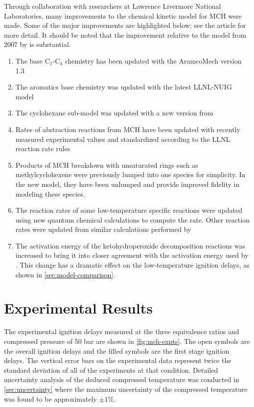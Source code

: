 \documentclass[12pt, letterpaper]{article}
\begin{document}
Through collaboration with researchers at Lawrence Livermore National 
Laboratories, many improvements to the chemical kinetic model for MCH were 
made. Some of the major improvements are highlighted below; see the article 
for more detail. It should be noted that the improvement relative to the model 
from 2007 by \textcite{Pitz2007} is substantial.

\begin{enumerate}
    \item The base C$_1$-C$_4$ chemistry has been updated with the AramcoMech 
        version 1.3 \cite{Metcalfe2013}
    \item The aromatics base chemistry was updated with the latest LLNL-NUIG
        model \cite{Nakamura2014}
    \item The cyclohexane sub-model was updated with a new version from 
        \textcite{Silke2007}
    \item Rates of abstraction reactions from MCH have been updated 
        with recently measured experimental values \cite{Sivaramakrishnan2009} 
        and standardized according to the LLNL reaction rate rules \cite{Sarathy2011b}
    \item Products of MCH breakdown with unsaturated rings such as 
        methylcyclohexene were previously lumped into one species for 
        simplicity. In the new model, they have been unlumped and 
        provide improved fidelity in modeling these species. \cite{Pitz2013}
    \item The reaction rates of some low-temperature specific reactions were 
        updated using new quantum chemical calculations to compute the rate. 
        Other reaction rates were updated from similar calculations performed 
        by \textcite{Fernandes2009}
    \item The activation energy of the ketohydroperoxide decomposition 
        reactions was increased to bring it into closer agreement with 
        the activation energy used by \textcite{Metcalfe2013}. This change 
        has a dramatic effect on the low-temperature ignition delays, as shown 
        in \autoref{sec:model-comparison}.
\end{enumerate}

\section{Experimental Results}
\label{sec:experimental-results}

The experimental ignition delays measured at the three equivalence ratios and 
compressed pressure of 50 bar are shown in \autoref{fig:mch-expts}. The open symbols are the 
overall ignition delays and the filled symbols are the first stage ignition 
delays. The vertical error bars on the experimental data represent twice the 
standard deviation of all of the experiments at that condition. Detailed 
uncertainty analysis of the deduced compressed temperature was conducted 
in \autoref{sec:uncertainty} where the maximum uncertainty of the compressed 
temperature was found to be approximately $±1\%$.
\end{document}
